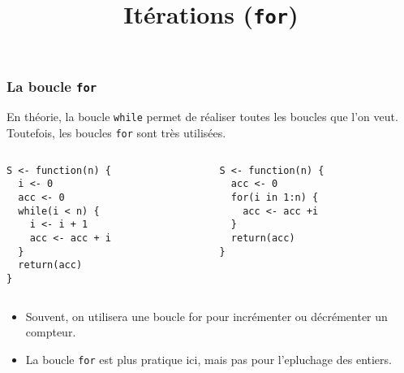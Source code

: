 \documentclass[10pt]{beamer}
\title{Itérations (\texttt{for})}
\begin{document}
\maketitle





\begin{frame}[fragile]
  \frametitle{La boucle \texttt{for}}
  
  En théorie, la boucle \texttt{while} permet de réaliser toutes les boucles que l'on veut.
  Toutefois, les boucles \texttt{for} sont très utilisées.

  
\begin{columns}[t]
\begin{column}{0.48\textwidth}
  \begin{lstlisting}[style=editor]
S <- function(n) {
  i <- 0
  acc <- 0
  while(i < n) {
    i <- i + 1
    acc <- acc + i
  }
  return(acc)
}
\end{lstlisting}
\end{column}
\begin{column}{0.43\textwidth}
\begin{lstlisting}[style=editor]
S <- function(n) {
  acc <- 0
  for(i in 1:n) {
    acc <- acc +i
  }
  return(acc)
}  
\end{lstlisting}
\end{column}
\end{columns}

\begin{itemize}
\item Souvent, on utilisera une boucle for pour incrémenter ou décrémenter un compteur.
\item La boucle \texttt{for} est plus pratique ici, mais pas pour l'epluchage des entiers.

\end{itemize}
\end{frame}
\end{document}
